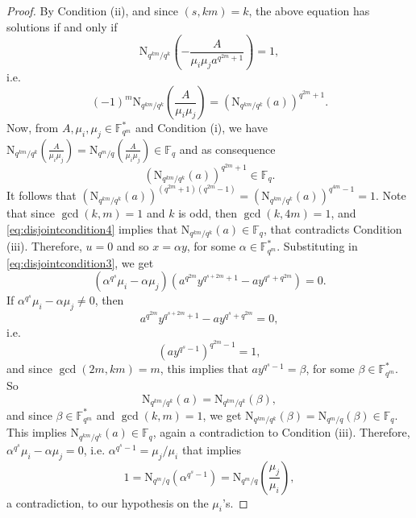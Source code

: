 \documentclass[11pt]{amsart}
\theoremstyle{definition}
\newcommand{\F}{{\mathbb F}}
\newcommand{\N}{\mathrm{N}}
\begin{document}
{\begin{proof}
By Condition (ii), and since $(s,km)=k$, the above equation has solutions if and only if 
\[
\N_{q^{km}/q^k} \left( -\frac{A}{\mu_i\mu_ja^{q^{2m}+1}} \right)=1,
\]
i.e.
\[
(-1)^m\N_{q^{km}/q^k} \left( \frac{A}{\mu_i\mu_j} \right)=(\N_{q^{km}/q^k} \left( a \right))^{q^{2m}+1}.
\]
Now, from $A,\mu_i,\mu_j \in \F_{q^m}^*$ and Condition (i), we have $\N_{q^{km}/q^k} \left( \frac{A}{\mu_i\mu_j} \right)=\N_{q^{m}/q} \left( \frac{A}{\mu_i\mu_j} \right)\in \F_q$ and as consequence 
\begin{equation} \label{eq:disjointcondition4}
(\N_{q^{km}/q^k} \left( a \right))^{q^{2m}+1} \in \F_q.
\end{equation}
It follows that $(\N_{q^{km}/q^k} \left( a \right))^{(q^{2m}+1)(q^{2m}-1)}=(\N_{q^{km}/q^k} \left( a \right))^{q^{4m}-1}=1$. 
Note that since $\gcd(k,m)=1$ and $k$ is odd, then $\gcd(k,4m)=1$, and \eqref{eq:disjointcondition4} implies that $\N_{q^{km}/q^k} \left( a \right) \in \F_q$, that contradicts Condition (iii). \newline
Therefore, $u=0$ and so $x=\alpha y$, for some $\alpha \in \F_{q^m}^*$. Substituting in \eqref{eq:disjointcondition3}, we get
\[
(\alpha^{q^s}\mu_i-\alpha \mu_j)(a^{q^{2m}} y^{q^{s+2m}+1}-ay^{q^{s}+q^{2m}})=0.
\]
If $\alpha^{q^s}\mu_i-\alpha \mu_j \neq 0$, then 
\[
a^{q^{2m}} y^{q^{s+2m}+1}-ay^{q^{s}+q^{2m}}=0,
\]
i.e. 
\[
(ay^{q^s-1})^{q^{2m}-1}=1,
\]
and since $\gcd(2m,km)=m$, this implies that $ay^{q^s-1}=\beta$, for some $\beta \in \F_{q^m}^*$. So 
\[
\N_{q^{km}/q^k}(a)=\N_{q^{km}/q^k}(\beta),
\]
and since $\beta \in \F_{q^m}^*$ and $\gcd(k,m)=1$, we get $\N_{q^{km}/q^k}(\beta)=\N_{q^{m}/q}(\beta) \in \F_q$. This implies $\N_{q^{km}/q^k}(a) \in \F_q$, again a contradiction to Condition (iii). \newline
Therefore, $\alpha^{q^s}\mu_i-\alpha \mu_j = 0$, i.e. $\alpha^{q^s-1}=\mu_j/\mu_i$ that implies 
\[
1=\N_{q^{m}/q}(\alpha^{q^s-1})=\N_{q^{m}/q}\left(\frac{\mu_j}{\mu_i}\right),
\]
a contradiction, to our hypothesis on the $\mu_i$'s.
\end{proof}






}
\end{document}
